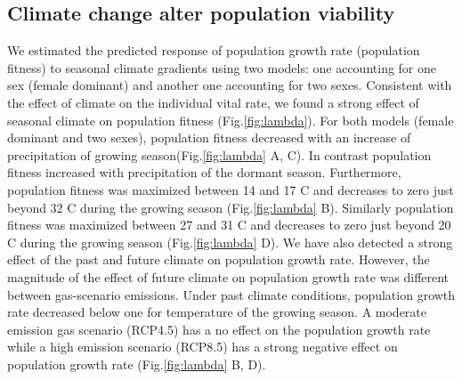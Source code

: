 \documentclass[12pt]{article}
\begin{document}
\subsection*{Climate change alter population viability}
We estimated the predicted response of  population growth rate (population fitness) to seasonal climate gradients using two models: one accounting for one sex (female dominant) and another one accounting for two sexes. 
Consistent with the effect of climate on the individual vital rate, we found a strong effect of seasonal climate on population fitness (Fig.\ref{fig:lambda}). 
For both models (female dominant and two sexes), population fitness decreased with an increase of precipitation of growing season(Fig.\ref{fig:lambda} A, C). 
In contrast population fitness increased with precipitation of the dormant season.
Furthermore, population fitness was maximized between 14 and 17 \degree C and decreases to zero just beyond 32 \degree C during the growing season (Fig.\ref{fig:lambda} B).
Similarly population fitness was maximized between 27 and 31 \degree C and decreases to zero just beyond 20 \degree C during the growing season (Fig.\ref{fig:lambda} D).
We have also detected a strong effect of the past and future climate on population growth rate. 
However, the magnitude of the effect of future climate on population growth rate was different between gas-scenario emissions. 
Under past climate conditions, population growth rate decreased below one for temperature of the growing season.
A moderate emission gas scenario (RCP4.5) has a no effect on the population growth rate while a high emission scenario (RCP8.5) has a strong negative effect on population growth rate (Fig.\ref{fig:lambda} B, D). 
\end{document}
